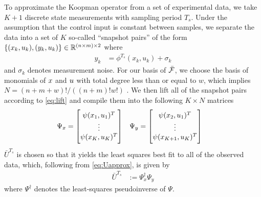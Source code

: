 

To approximate the Koopman operator from a set of experimental data, we take $K+1$ discrete state measurements with sampling period $T_s$. Under the assumption that the control input is constant between samples, we separate the data into a set of $K$ so-called ``snapshot pairs'' of the form ${ \{(x_k,u_k),(y_{k},u_k)\} \in \mathbb{R}^{(n \times m) \times 2} }$ where
\begin{align}
    y_{k} &= \phi^{T_s} (x_k, u_k) + \sigma_k
\end{align}
and $\sigma_k$ denotes measurement noise.
For our basis of $\bar{\mathcal{F}}$, we choose the basis of monomials of $x$ and $u$ with total degree less than or equal to $w$, which implies $N=(n+m+w)!/\left((n+m)!w!\right)$ \cite[Section III]{mauroy2016linear}. 
We then lift all of the snapshot pairs according to \eqref{eq:lift} and compile them into the following $K \times N$ matrices
\begin{align}
    &\Psi_x = \begin{bmatrix}  {\psi}(x_1, u_1)^T \\ \vdots \\  {\psi}(x_K, u_K)^T \end{bmatrix}
    &&\Psi_y = \begin{bmatrix}  {\psi}(x_2, u_1)^T \\ \vdots \\  {\psi}(x_{K+1}, u_{K})^T \end{bmatrix}
\end{align}
 $\bar{U}^{T_s}$ is chosen so that it yields the least squares best fit to all of the observed data, which, following from \eqref{eq:Uapprox}, is given by 
\begin{align}
    \bar{U}^{T_s} &:= \Psi_x^\dagger \Psi_y
\end{align}
where ${\Psi}^\dagger$ denotes the least-squares pseudoinverse of ${\Psi}$.


